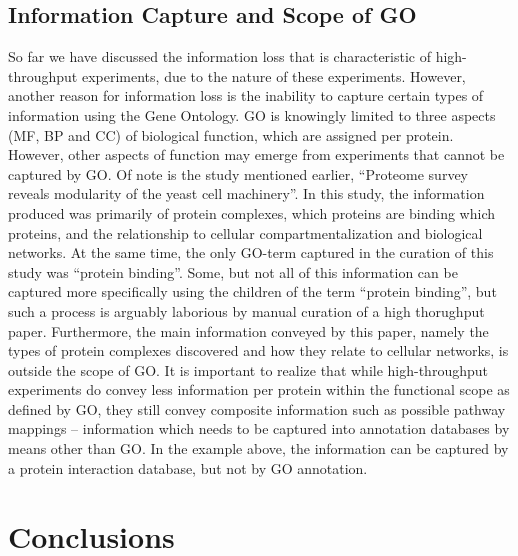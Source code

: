\documentclass[12pt]{article}
\begin{document}
\subsection*{Information Capture and Scope of GO}

So far we have discussed the information loss that is characteristic of high-throughput experiments,
due to the nature of these experiments. However, another reason for information loss is the
inability to capture certain types of information using the Gene Ontology. GO is knowingly limited
to three aspects (MF, BP and CC) of biological function, which are assigned per protein.  However,
other aspects of function may emerge from experiments that cannot be captured by GO.  Of note is the
study mentioned earlier, ``Proteome survey reveals modularity of the yeast cell
machinery''\cite{pmid18029348}.  In this study, the information produced was primarily of protein
complexes, which proteins are binding which proteins, and the relationship to cellular
compartmentalization and biological networks. At the same time, the only GO-term captured in the
curation of this study was ``protein binding''.  Some, but not all of this information can be
captured more specifically using the children of the term ``protein binding'', but such a
process is arguably laborious by manual curation of a high thorughput paper.
Furthermore, the main information conveyed by this
paper, namely the types of protein complexes discovered and how they relate to cellular networks, is
outside the scope of GO. It is important to realize that while high-throughput experiments do convey
less information per protein within the functional scope as defined by GO, they still convey
composite information such as possible pathway mappings --
information which needs to be captured into annotation databases by means other than GO.
In the example above, the information can be captured by a protein interaction database, but not by
GO annotation.

\section*{Conclusions}
\end{document}
